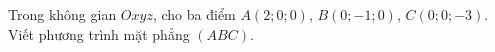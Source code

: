 \begin{ex}
Trong không gian $Oxyz$, cho ba điểm $A(2;0;0)$, $B(0;-1;0)$, $C(0;0;-3)$. Viết phương trình mặt phẳng $(ABC)$.
\end{ex}
